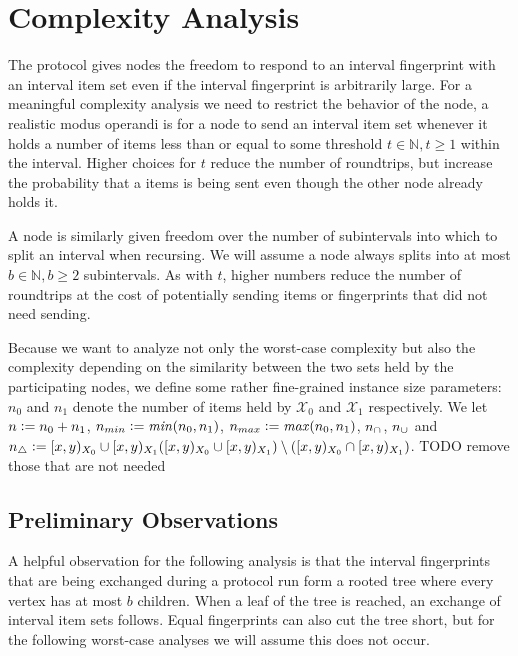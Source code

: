 \section{Complexity Analysis}
\label{set-reconciliation-complexity}

The protocol gives nodes the freedom to respond to an interval fingerprint with an interval item set even if the interval fingerprint is arbitrarily large. For a meaningful complexity analysis we need to restrict the behavior of the node, a realistic modus operandi is for a node to send an interval item set whenever it holds a number of items less than or equal to some threshold $t \in \mathbb{N}, t \geq 1$ within the interval. Higher choices for $t$ reduce the number of roundtrips, but increase the probability that a items is being sent even though the other node already holds it.

A node is similarly given freedom over the number of subintervals into which to split an interval when recursing. We will assume a node always splits into at most $b \in \mathbb{N}, b \geq 2$ subintervals. As with $t$, higher numbers reduce the number of roundtrips at the cost of potentially sending items or fingerprints that did not need sending.

Because we want to analyze not only the worst-case complexity but also the complexity depending on the similarity between the two sets held by the participating nodes, we define some rather fine-grained instance size parameters: $n_0$ and $n_1$ denote the number of items held by $\mathcal{X}_0$ and $\mathcal{X}_1$ respectively. We let $n \vcentcolon= n_0 + n_1$, $n_{min} \vcentcolon= \mathit{min}(n_0, n_1)$, $n_{max} \vcentcolon= \mathit{max}(n_0, n_1)$, $n_{\cap} \def \abs{\interval{x}{y}{X_0} \cap \interval{x}{y}{X_1}}$, $n_{\cup} \def \abs{\interval{x}{y}{X_0} \cup \interval{x}{y}{X_1}}$ and $n_{\triangle} \defeq \abs{(\interval{x}{y}{X_0} \cup \interval{x}{y}{X_1}) \setminus (\interval{x}{y}{X_0} \cap \interval{x}{y}{X_1})}$. TODO remove those that are not needed

\subsection{Preliminary Observations}

A helpful observation for the following analysis is that the interval fingerprints that are being exchanged during a protocol run form a rooted tree where every vertex has at most $b$ children. When a leaf of the tree is reached, an exchange of interval item sets follows. Equal fingerprints can also cut the tree short, but for the following worst-case analyses we will assume this does not occur.

